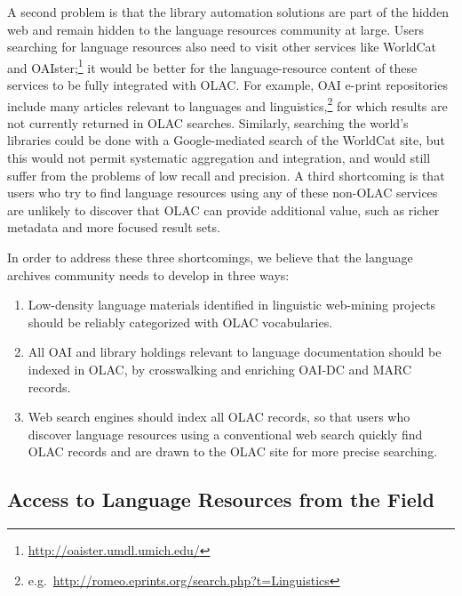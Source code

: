 A second problem is that the library automation solutions are part of
the hidden web and remain hidden to the language resources community
at large.
Users searching for language
resources also need to visit other services like WorldCat and OAIster;\footnote{\scriptsize\url{http://oaister.umdl.umich.edu/}}
it would be better for the language-resource content
of these services to be fully integrated with OLAC.
For example, OAI e-print repositories include many articles
relevant to languages and linguistics,\footnote{e.g.\ \small\url{http://romeo.eprints.org/search.php?t=Linguistics}}
for which results are not currently returned in OLAC searches.
Similarly, searching the world's libraries could be done with a
Google-mediated search of the WorldCat site, but this would not
permit systematic aggregation and integration, and would still suffer
from the problems of low recall and precision.
A third shortcoming is that users who try to find language resources
using any of these non-OLAC services are unlikely to discover that
OLAC can provide additional value, such as richer metadata and more
focused result sets.


In order to address these three shortcomings, we believe that the
language archives community needs to develop in three ways:

\renewcommand{\labelenumi}{T-2.\arabic{enumi}}
\begin{enumerate}\setlength{\itemsep}{0pt}
\item Low-density language materials identified in linguistic web-mining projects
      should be reliably categorized with OLAC vocabularies.
\item All OAI and library holdings relevant to language
      documentation should be indexed in OLAC, by
      crosswalking and enriching OAI-DC and MARC records.
\item Web search engines should index all OLAC records, so that
      users who discover language resources using a conventional 
      web search quickly find OLAC records and are drawn to the
      OLAC site for more precise searching.
\end{enumerate}

\subsection{Access to Language Resources from the Field}

